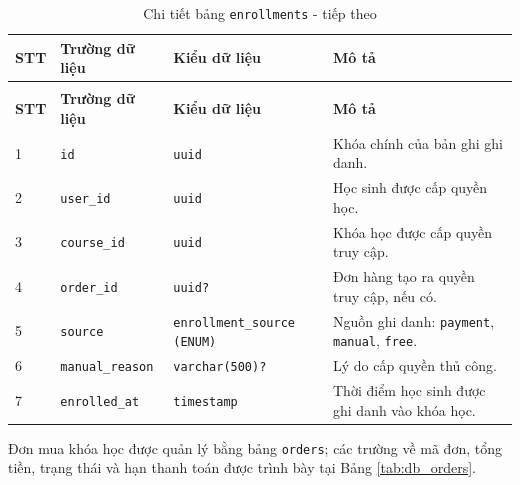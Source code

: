 \documentclass[../DoAn.tex]{subfiles}
\begin{document}
{\begin{longtable}{|p{}|p{}|p{}|p{}|}
\caption{Chi tiết bảng \texttt{enrollments}}
\label{tab:db_enrollments}\\
\hline
\textbf{STT} & \textbf{Trường dữ liệu} & \textbf{Kiểu dữ liệu} & \textbf{Mô tả} \\ \hline
\endfirsthead
\caption[]{Chi tiết bảng \texttt{enrollments} - tiếp theo}\\
\hline
\textbf{STT} & \textbf{Trường dữ liệu} & \textbf{Kiểu dữ liệu} & \textbf{Mô tả} \\ \hline
\endhead
1 & \texttt{id} & \texttt{uuid} & Khóa chính của bản ghi ghi danh. \\ \hline
2 & \texttt{user\_id} & \texttt{uuid} & Học sinh được cấp quyền học. \\ \hline
3 & \texttt{course\_id} & \texttt{uuid} & Khóa học được cấp quyền truy cập. \\ \hline
4 & \texttt{order\_id} & \texttt{uuid?} & Đơn hàng tạo ra quyền truy cập, nếu có. \\ \hline
5 & \texttt{source} & \texttt{enrollment\_source (ENUM)} & Nguồn ghi danh: \texttt{payment}, \texttt{manual}, \texttt{free}. \\ \hline
6 & \texttt{manual\_reason} & \texttt{varchar(500)?} & Lý do cấp quyền thủ công. \\ \hline
7 & \texttt{enrolled\_at} & \texttt{timestamp} & Thời điểm học sinh được ghi danh vào khóa học. \\ \hline
\end{longtable}

Đơn mua khóa học được quản lý bằng bảng \texttt{orders}; các trường về mã đơn, tổng tiền, trạng thái và hạn thanh toán được trình bày tại Bảng \ref{tab:db_orders}.

}
\end{document}
